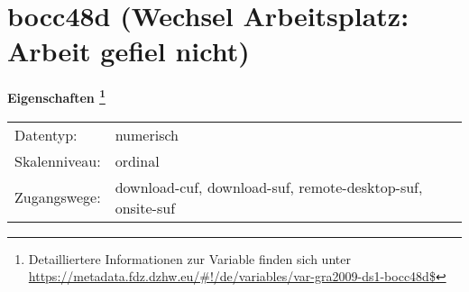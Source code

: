 
    \setcounter{footnote}{0}

    \vspace*{-1.8cm}
	\section{bocc48d (Wechsel Arbeitsplatz: Arbeit gefiel nicht)}
	\label{section:bocc48d}



    \vspace*{0.5cm}
    \noindent\textbf{Eigenschaften
	\footnote{Detailliertere Informationen zur Variable finden sich unter
		\url{https://metadata.fdz.dzhw.eu/\#!/de/variables/var-gra2009-ds1-bocc48d$}}}\\
	\begin{tabularx}{\hsize}{@{}lX}
	Datentyp: & numerisch \\
	Skalenniveau: & ordinal \\
	Zugangswege: &
	  download-cuf, 
	  download-suf, 
	  remote-desktop-suf, 
	  onsite-suf
 \\
    \end{tabularx}



